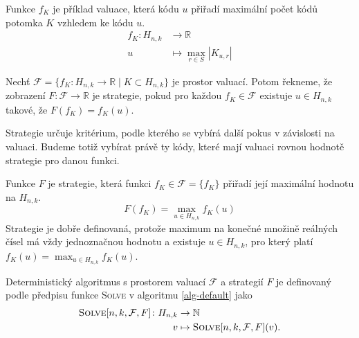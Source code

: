 \begin{prikl}\label{prjednokrokfce}
    Funkce $f_K$ je příklad valuace, která kódu $u$ přiřadí maximální počet kódů potomka $K$ vzhledem ke kódu $u$.
    \begin{align*}
        f_K \colon H_{n,k} &\to \mathbb{R} \\
        u &\mapsto \max_{r\in S} |K_{u,r}|
    \end{align*}
\end{prikl}


\begin{definice}[Strategie]
    Nechť $\mathcal{F} = \{f_K\colon H_{n,k} \to \mathbb{R} \mid K \subset H_{n,k}\}$ je prostor valuací. Potom řekneme, že zobrazení $F \colon \mathcal{F} \to \mathbb{R}$ je strategie, pokud pro každou $f_K \in \mathcal{F}$ existuje $u\in H_{n,k}$ takové, že $F(f_K) = f_K(u)$.
\end{definice}
Strategie určuje kritérium, podle kterého se vybírá další pokus v závislosti na valuaci. Budeme totiž vybírat právě ty kódy, které mají valuaci rovnou hodnotě strategie pro danou funkci. 


\begin{prikl}\label{prstrategie}
    Funkce $F$ je strategie, která funkci $f_K \in \mathcal{F} = \{f_K\}$ přiřadí její maximální hodnotu na $H_{n,k}$.
    \[F(f_K) =  \max_{u\in H_{n,k}} f_K(u)\]
    Strategie je dobře definovaná, protože maximum na konečné množině reálných čísel má vždy jednoznačnou hodnotu a existuje $u\in H_{n,k}$, pro který platí $f_K(u) = \max_{u\in H_{n,k}} f_K(u)$.
\end{prikl}

\begin{definice}\label{defobecnyalg}
    Deterministický algoritmus s prostorem valuací $\mathcal{F}$ a strategií $F$ je definovaný podle předpisu funkce \textsc{Solve} v algoritmu \ref{alg-default} jako
    \begin{align*}
        \textsc{Solve}[n, k, \mathcal{F}, F] \colon H_{n,k} &\to \mathbb{N} \\
        v & \mapsto \textsc{Solve}[n, k, \mathcal{F}, F](v).
    \end{align*}
    
    
\end{definice}


